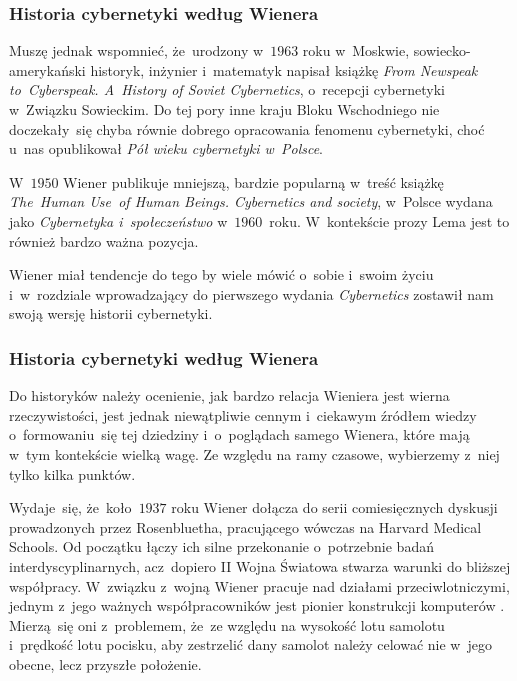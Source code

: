 \documentclass[10pt,t]{beamer}
\begin{document}
\begin{frame}
  \frametitle{Historia cybernetyki według Wienera}


  Muszę jednak wspomnieć, że~urodzony w~$1963$ roku w~Moskwie,
  sowiecko-amerykański historyk, inżynier i~matematyk
  napisał książkę
  {\textit{From Newspeak to~Cyberspeak. A~History of Soviet Cybernetics}},
  o~recepcji cybernetyki w~Związku Sowieckim. Do tej pory inne kraju
  Bloku Wschodniego nie doczekały~się chyba równie dobrego opracowania
  fenomenu cybernetyki, choć u~nas
  opublikował \textit{Pół wieku cybernetyki w~Polsce}.

  W~$1950$ Wiener publikuje mniejszą, bardzie
  popularną w~treść książkę
  {\textit{The~Human Use~of Human Beings. Cybernetics and society}},
  w~Polsce wydana jako \textit{Cybernetyka i~społeczeństwo} w~$1960$~roku.
  W~kontekście prozy Lema jest to również bardzo ważna pozycja.

  Wiener miał tendencje do tego by wiele mówić o~sobie i~swoim
  życiu i~w~rozdziale wprowadzający do pierwszego wydania
  \textit{Cybernetics} zostawił nam swoją wersję historii cybernetyki.

\end{frame}





\begin{frame}
  \frametitle{Historia cybernetyki według Wienera}


  Do historyków należy ocenienie, jak bardzo relacja
  Wieniera jest wierna rzeczywistości, jest jednak niewątpliwie cennym
  i~ciekawym źródłem wiedzy o~formowaniu~się tej dziedziny i~o~poglądach
  samego Wienera, które mają w~tym kontekście wielką wagę. Ze względu na
  ramy czasowe, wybierzemy z~niej tylko kilka punktów.

  Wydaje~się, że~koło~$1937$ roku Wiener dołącza do serii comiesięcznych
  dyskusji prowadzonych przez Rosenbluetha, pracującego wówczas na Harvard
  Medical Schools. Od początku
  łączy ich silne przekonanie o~potrzebnie badań interdyscyplinarnych,
  acz~dopiero II Wojna Światowa stwarza warunki do bliższej współpracy.
  W~związku z~wojną Wiener pracuje nad działami przeciwlotniczymi, jednym
  z~jego ważnych współpracowników jest pionier konstrukcji komputerów
  . Mierzą~się oni z~problemem, że~ze względu na wysokość lotu
  samolotu i~prędkość lotu pocisku, aby zestrzelić dany samolot należy
  celować nie w~jego obecne, lecz przyszłe położenie.

\end{frame}
\end{document}
